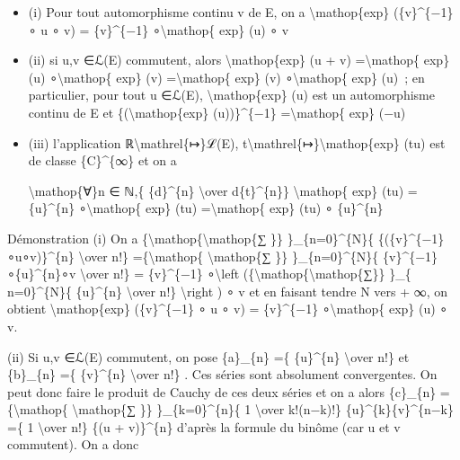 \documentclass[]{article}
\begin{document}
\begin{itemize}
\item
  (i) Pour tout automorphisme continu v de E, on a
  \textbackslash{}mathop\{exp\} (\{v\}\^{}\{−1\} ∘ u ∘ v) =
  \{v\}\^{}\{−1\} ∘\textbackslash{}mathop\{ exp\} (u) ∘ v
\item
  (ii) si u,v ∈ℒ(E) commutent, alors \textbackslash{}mathop\{exp\} (u +
  v) =\textbackslash{}mathop\{ exp\} (u) ∘\textbackslash{}mathop\{ exp\}
  (v) =\textbackslash{}mathop\{ exp\} (v) ∘\textbackslash{}mathop\{
  exp\} (u)~; en particulier, pour tout u ∈ℒ(E),
  \textbackslash{}mathop\{exp\} (u) est un automorphisme continu de E et
  \{(\textbackslash{}mathop\{exp\} (u))\}\^{}\{−1\}
  =\textbackslash{}mathop\{ exp\} (−u)
\item
  (iii) l'application ℝ\textbackslash{}mathrel\{↦\}ℒ(E),
  t\textbackslash{}mathrel\{↦\}\textbackslash{}mathop\{exp\} (tu) est de
  classe \{C\}\^{}\{∞\} et on a

  \textbackslash{}mathop\{∀\}n ∈ ℕ,\{ \{d\}\^{}\{n\}
  \textbackslash{}over d\{t\}\^{}\{n\}\} \textbackslash{}mathop\{ exp\}
  (tu) = \{u\}\^{}\{n\} ∘\textbackslash{}mathop\{ exp\} (tu)
  =\textbackslash{}mathop\{ exp\} (tu) ∘ \{u\}\^{}\{n\}
\end{itemize}

Démonstration (i) On a
\{\textbackslash{}mathop\{\textbackslash{}mathop\{∑ \}\}
\}\_\{n=0\}\^{}\{N\}\{ \{(\{v\}\^{}\{−1\}∘u∘v)\}\^{}\{n\}
\textbackslash{}over n!\} =\{\textbackslash{}mathop\{
\textbackslash{}mathop\{∑ \}\} \}\_\{n=0\}\^{}\{N\}\{
\{v\}\^{}\{−1\}∘\{u\}\^{}\{n\}∘v \textbackslash{}over n!\} =
\{v\}\^{}\{−1\} ∘\textbackslash{}left
(\{\textbackslash{}mathop\{\textbackslash{}mathop\{∑\}\} \}\_\{
n=0\}\^{}\{N\}\{ \{u\}\^{}\{n\} \textbackslash{}over n!\}
\textbackslash{}right ) ∘ v et en faisant tendre N vers + ∞, on obtient
\textbackslash{}mathop\{exp\} (\{v\}\^{}\{−1\} ∘ u ∘ v) =
\{v\}\^{}\{−1\} ∘\textbackslash{}mathop\{ exp\} (u) ∘ v.

(ii) Si u,v ∈ℒ(E) commutent, on pose \{a\}\_\{n\} =\{ \{u\}\^{}\{n\}
\textbackslash{}over n!\} et \{b\}\_\{n\} =\{ \{v\}\^{}\{n\}
\textbackslash{}over n!\} . Ces séries sont absolument convergentes. On
peut donc faire le produit de Cauchy de ces deux séries et on a alors
\{c\}\_\{n\} =\{\textbackslash{}mathop\{ \textbackslash{}mathop\{∑ \}\}
\}\_\{k=0\}\^{}\{n\}\{ 1 \textbackslash{}over k!(n−k)!\}
\{u\}\^{}\{k\}\{v\}\^{}\{n−k\} =\{ 1 \textbackslash{}over n!\} \{(u +
v)\}\^{}\{n\} d'après la formule du binôme (car u et v commutent). On a
donc
\end{document}
